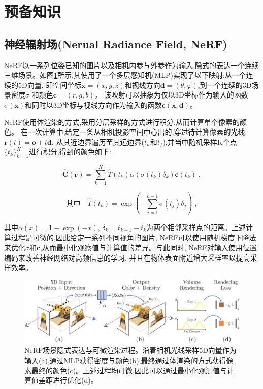 \section{预备知识}\label{preliminaries}

\subsection{神经辐射场(Nerual\; Radiance\; Field, NeRF)}

NeRF以一系列位姿已知的图片以及相机内参与外参作为输入,隐式的表达一个连续三维场景。如图\ref{nerf}所示,其使用了一个多层感知机(MLP)实现了以下映射:从一个连续的5D向量,
即空间坐标$\mathbf{x}=(x,y,z)$和视线方向$\mathbf{d}=( \theta,\varphi )$,到一个连续的3D场景密度$\sigma$ 和颜色$\mathbf{c}=(r,g,b)$。
该映射可以抽象为仅以3D坐标作为输入的函数$\sigma (\mathbf{x})$和同时以3D坐标与视线方向作为输入的函数$\mathbf{c(x,d)}$。

NeRF使用体渲染的方式,采用分层采样的方式进行积分,从而计算单个像素的颜色。
在一次计算中,给定一条从相机投影空间中心出的,穿过待计算像素的光线$\mathbf{r}(t)=\mathbf{o}+t\mathbf{d}$,
从其近边界遍历至其远边界($t_n$和$t_f$),并当中随机采样K个点$\{t_k\}_{k=1}^K$进行积分,得到的颜色如下:

\begin{equation}
    \hat{\mathbf{C}}(\mathbf{r})=\sum_{k=1}^{K}\hat{T}(t_k)\alpha(\sigma(t_k)\delta_k)\mathbf{c}(t_k)\;,
\end{equation}

\begin{equation}
     \mbox{其中} \quad \hat{T}(t_k)=\exp{\left (-\sum_{j = 1}^{k-1}\sigma(t_j)\delta_j\right )}\;,
\end{equation}

其中$\alpha(x)=1-\exp{(-x)}$, $\delta_k=t_{k+1}-t_k$为两个相邻采样点的距离。上述计算过程是可微的,因此给定一系列不同视角的图片, NeRF可以使用随机梯度下降法来优化$\sigma$和$\mathbf{c}$,从而最小化观察值与计算值的差异。与此同时, NeRF对输入使用位置编码来改善神经网络对高频信息的学习, 并且在物体表面附近增大采样率以提高采样效率。

\begin{figure}[htbp]
    \includegraphics[scale = 1.2]{figures/nerf.png}
    \centering
    \caption{NeRF场景隐式表达与可微渲染过程。沿着相机光线采样5D向量作为输入(a),通过MLP获得密度与颜色(b),最终通过体渲染的方式获得像素最终的颜色(c)。上述过程均可微,因此可以通过最小化观测值与计算值差距进行优化(d)。} \label{nerf}
\end{figure}
